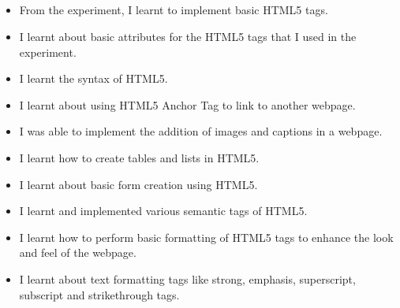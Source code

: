\documentclass[12pt, a4]{article}
\begin{document}
\subsection*{}
\begin{itemize}

\item From the experiment, I learnt to implement basic HTML5 tags.
\item I learnt about basic attributes for the HTML5 tags that I used in the experiment.
\item I learnt the syntax of HTML5.
\item I learnt about using HTML5 Anchor Tag to link to another webpage.
\item I was able to implement the addition of images and captions in a webpage.
\item I learnt how to create tables and lists in HTML5.
\item I learnt about basic form creation using HTML5.
\item I learnt and implemented various semantic tags of HTML5.
\item I learnt how to perform basic formatting of HTML5 tags to enhance the look and feel of the webpage.
\item I learnt about text formatting tags like strong, emphasis, superscript, subscript and strikethrough tags.

\end{itemize}
\end{document}
